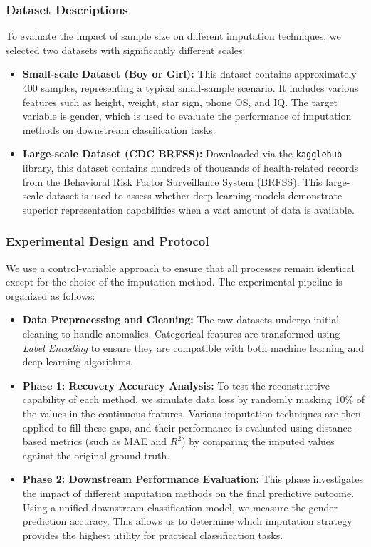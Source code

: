 \documentclass[twocolumn, 9pt]{extarticle}
\begin{document}
\subsubsection{Dataset Descriptions}
To evaluate the impact of sample size on different imputation techniques, we selected two datasets with significantly different scales:
\begin{itemize}
    \item \textbf{Small-scale Dataset (Boy or Girl):} This dataset contains approximately 400 samples, representing a typical small-sample scenario. It includes various features such as height, weight, star sign, phone OS, and IQ. The target variable is gender, which is used to evaluate the performance of imputation methods on downstream classification tasks.
    \item \textbf{Large-scale Dataset (CDC BRFSS):} Downloaded via the \texttt{kagglehub} library, this dataset contains hundreds of thousands of health-related records from the Behavioral Risk Factor Surveillance System (BRFSS). This large-scale dataset is used to assess whether deep learning models demonstrate superior representation capabilities when a vast amount of data is available.
\end{itemize}

\subsubsection{Experimental Design and Protocol}
We use a control-variable approach to ensure that all processes remain identical except for the choice of the imputation method. The experimental pipeline is organized as follows:

\begin{itemize}
    \item \textbf{Data Preprocessing and Cleaning:} The raw datasets undergo initial cleaning to handle anomalies. Categorical features are transformed using \textit{Label Encoding} to ensure they are compatible with both machine learning and deep learning algorithms.
    \item \textbf{Phase 1: Recovery Accuracy Analysis:} To test the reconstructive capability of each method, we simulate data loss by randomly masking 10\% of the values in the continuous features. Various imputation techniques are then applied to fill these gaps, and their performance is evaluated using distance-based metrics (such as MAE and $R^2$) by comparing the imputed values against the original ground truth.
    \item \textbf{Phase 2: Downstream Performance Evaluation:} This phase investigates the impact of different imputation methods on the final predictive outcome. Using a unified downstream classification model, we measure the gender prediction accuracy. This allows us to determine which imputation strategy provides the highest utility for practical classification tasks.
\end{itemize}
\end{document}
